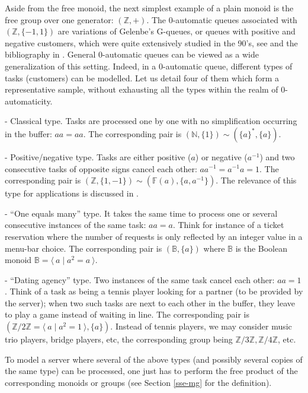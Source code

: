 \documentclass[11pt,a4paper]{article}
\theoremstyle{remark}
\def\Blackboardfont{\mathbb}
\newcommand{\pres}[2]{\langle \: #1 \mid #2 \: \rangle}
\def\B{{\Blackboardfont B}}
\def\F{{\Blackboardfont F}}
\def\Z{{\Blackboardfont Z}}
\def\N{{\Blackboardfont N}}
\begin{document}
Aside from the free monoid, the next simplest example of a
plain monoid is the free group over one generator:
$(\Z,+)$. The 0-automatic queues associated with $(\Z,\{-1,1\})$ 
are variations of Gelenbe's
G-queues, or queues with positive and negative customers, which
were quite extensively studied in the 90's, see \cite{gele91,FGSu}
and the bibliography in \cite{GePu}. General 0-automatic queues
can be viewed as a wide generalization of this setting. 
Indeed, in a 0-automatic queue, different types of tasks (customers) can
be modelled. Let us detail four of them which form a
representative sample, without exhausting all the types within the
realm of 0-automaticity.

\medskip

- Classical type. Tasks are processed one by one with no
  simplification occurring in the buffer: $aa=aa$. The corresponding
  pair is $(\N,\{1\})\sim (\{a\}^*,\{a\})$.

\medskip

- Positive/negative type. Tasks are either positive ($a$) or
negative
  ($a^{-1}$) and two consecutive tasks of opposite signs cancel each
  other: $aa^{-1}=a^{-1}a=1$. The corresponding pair is
  $(\Z,\{1,-1\})\sim (\F(a),\{a,a^{-1}\})$.  The relevance of this type
  for applications is discussed in \cite{GePu}.

\medskip

- ``One equals many'' type. It takes the same time to process one
or
  several consecutive instances of the same task: $aa=a$. Think for instance of a ticket
  reservation where the number of requests is only reflected by
  an integer value in a menu-bar choice. The corresponding pair is
  $(\B,\{a\})$ where $\B$ is the Boolean monoid $\B = \pres{a}{a^2=a}$.

\medskip

- ``Dating agency'' type. Two instances of the same task cancel
each
  other: $aa=1$. Think of a task as being a tennis player looking for
  a partner (to be provided by the server); when two such tasks
  are next to each other in the buffer, they leave to play a
  game instead of waiting in line. The corresponding pair is
  $(\Z/2\Z=\pres{a}{a^2=1},\{a\})$. Instead of tennis players, we may
  consider music trio players, bridge players, etc, the corresponding
  group being $\Z/3\Z, \Z/4\Z$, etc.

\medskip

To model a server where several of the above types (and possibly
several copies of the same type) can be processed, one just has to
perform the free product of the corresponding monoids or groups (see
Section \ref{sse-mg} for the definition). 
\end{document}
